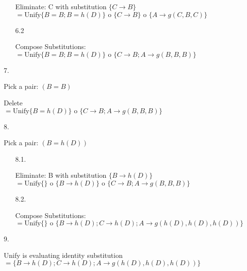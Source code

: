 \begin{enumerate}
\begin{enumerate}
	Eliminate: C with substitution \( \{ C \rightarrow B \} \) \\
	\hspace*{4mm}\( = \text{Unify} \{ B = B; B = h(D) \}\text{ o }\{ C \rightarrow B \}\text{ o }\{ A \rightarrow g(C,B,C) \} \)
	
	\item[6.2]
	
	Compose Substitutions: \\
	\hspace*{4mm}\( = \text{Unify} \{ B = B; B = h(D) \}\text{ o }\{ C \rightarrow B; A \rightarrow g(B, B, B) \} \)
	\end{enumerate}
	
	\item[7.]
	
	Pick a pair: \( (B = B) \)
	
	Delete \\
	\hspace*{4mm}\( = \text{Unify} \{ B = h(D) \}\text{ o }\{ C \rightarrow B; A \rightarrow g(B, B, B) \} \)

	\item[8.]
	
	Pick a pair:  \( (B = h(D)) \)
	
	\begin{enumerate}
	
    	\item[8.1.]
    	
    	Eliminate: B with substitution \( \{ B \rightarrow h(D) \} \) \\
    	\hspace*{4mm}\( = \text{Unify} \{ \}\text{ o }\{ B \rightarrow h(D) \}\text{ o }\{ C \rightarrow B; A \rightarrow g(B, B, B) \} \)
    	
    	\item[8.2.]
    	
    	Compose Substitutions: \\
    	\hspace*{4mm}\( = \text{Unify} \{ \}\text{ o }\{ B \rightarrow h(D); C \rightarrow h(D); A \rightarrow g(h(D), h(D), h(D) ) \} \)
	\end{enumerate}
	
	\item[9.]
	
	Unify is evaluating identity substitution \\
    	\hspace*{4mm}\( = \{ B \rightarrow h(D); C \rightarrow h(D); A \rightarrow g(h(D), h(D), h(D) ) \} \)
\end{enumerate}

